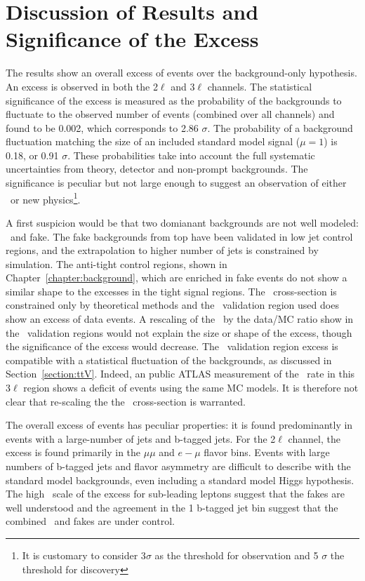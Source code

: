 \section{Discussion of Results and Significance of the Excess}

The results show an overall excess of events over the background-only hypothesis. An excess is observed in both the 2$\ell$ and 3$\ell$ channels. The statistical significance of the excess is measured as the probability of the backgrounds to fluctuate to the observed number of events (combined over all channels) and found to be 0.002, which corresponds to 2.86 $\sigma$. The probability of a background fluctuation matching the size of an included standard model signal ($\mu=1$) is 0.18, or 0.91 $\sigma$. These probabilities take into account the full systematic uncertainties from theory, detector and non-prompt backgrounds. The significance is peculiar but not large enough to suggest an observation of either \tth\ or new physics\footnote{It is customary to consider 3$\sigma$ as the threshold for observation and 5 $\sigma$ the threshold for discovery}. 

A first suspicion would be that two domianant backgrounds are not well modeled: \ttV\ and fake. The fake backgrounds from top have been validated in low jet control regions, and the extrapolation to higher number of jets is constrained by simulation. The anti-tight control regions, shown in Chapter~\ref{chapter:background}, which are enriched in fake events do not show a similar shape to the excesses in the tight signal regions. The \ttV\ cross-section is constrained only by theoretical methods and the \ttZ\ validation region used does show an excess of data events. A rescaling of the \ttV\ by the data/MC ratio show in the \ttZ\ validation regions would not explain the size or shape of the excess, though the significance of the excess would decrease. The \ttZ\ validation region excess is compatible with a statistical fluctuation of the backgrounds, as discussed in Section~\ref{section:ttV}. Indeed, an public ATLAS measurement of the \ttZ\ rate in this 3$\ell$ region shows a deficit of events \cite{ATLAS-CONF-2012-126} using the same MC models. It is therefore not clear that re-scaling the the \ttV\ cross-section is warranted. 

The overall excess of events has peculiar properties: it is found predominantly in events with a large-number of jets and b-tagged jets.  For the 2$\ell$ channel, the excess is found primarily in the $\mu\mu$ and $e-\mu$ flavor bins. Events with large numbers of b-tagged jets and flavor asymmetry are difficult to describe with the standard model backgrounds, even including a standard model Higgs hypothesis. The high \pt\ scale of the excess for sub-leading leptons suggest that the fakes are well understood and the agreement in the 1 b-tagged jet bin suggest that the combined \ttV\ and fakes are under control. 


